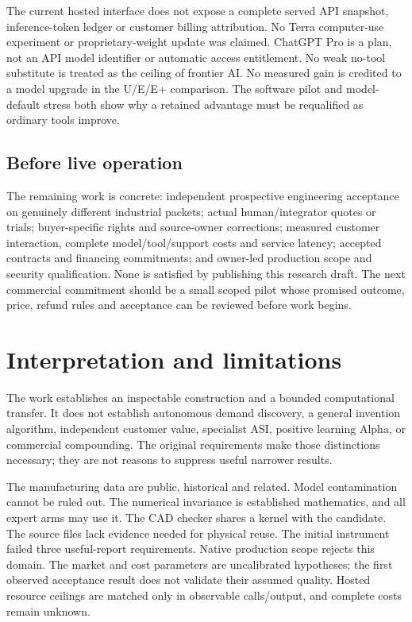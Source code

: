 \documentclass[
  11pt,
]{article}
\let\OriginalSection\section
\renewcommand{\section}{\needspace{5\baselineskip}\OriginalSection}
\let\OriginalSubsection\subsection
\renewcommand{\subsection}{\needspace{6\baselineskip}\OriginalSubsection}
\begin{document}
The current hosted interface does not expose a complete served API
snapshot, inference-token ledger or customer billing attribution. No
Terra computer-use experiment or proprietary-weight update was claimed.
ChatGPT Pro is a plan, not an API model identifier or automatic access
entitlement. No weak no-tool substitute is treated as the ceiling of
frontier AI. No measured gain is credited to a model upgrade in the
U/E/E+ comparison. The software pilot and model-default stress both show
why a retained advantage must be requalified as ordinary tools improve.

\hypertarget{before-live-operation}{%
\subsection{Before live operation}\label{before-live-operation}}

The remaining work is concrete: independent prospective engineering
acceptance on genuinely different industrial packets; actual
human/integrator quotes or trials; buyer-specific rights and
source-owner corrections; measured customer interaction, complete
model/tool/support costs and service latency; accepted contracts and
financing commitments; and owner-led production scope and security
qualification. None is satisfied by publishing this research draft. The
next commercial commitment should be a small scoped pilot whose promised
outcome, price, refund rules and acceptance can be reviewed before work
begins.

\hypertarget{interpretation-and-limitations}{%
\section{Interpretation and
limitations}\label{interpretation-and-limitations}}

The work establishes an inspectable construction and a bounded
computational transfer. It does not establish autonomous demand
discovery, a general invention algorithm, independent customer value,
specialist ASI, positive learning Alpha, or commercial compounding. The
original requirements make those distinctions necessary; they are not
reasons to suppress useful narrower results.

The manufacturing data are public, historical and related. Model
contamination cannot be ruled out. The numerical invariance is
established mathematics, and all expert arms may use it. The CAD checker
shares a kernel with the candidate. The source files lack evidence
needed for physical reuse. The initial instrument failed three
useful-report requirements. Native production scope rejects this domain.
The market and cost parameters are uncalibrated hypotheses; the first
observed acceptance result does not validate their assumed quality.
Hosted resource ceilings are matched only in observable calls/output,
and complete costs remain unknown.
\end{document}
